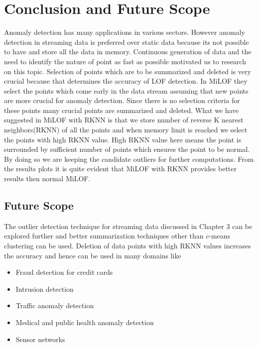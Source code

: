 \chapter{Conclusion and Future Scope}\label{Conclusion and Future Scope}
Anomaly detection has many applications in various sectors. However anomaly detection in
streaming data is preferred over static data because its not possible to have and store all the data
in memory. Continuous generation of data and the need to identify the nature of point as fast as
possible motivated us to research on this topic.
Selection of points which are to be summarized and deleted is very crucial because that determines
the accuracy of LOF detection. In MiLOF they select the points which come early in the data stream
assuming that new points are more crucial for anomaly detection. Since there is no selection criteria
for these points many crucial points are summarized and deleted. What we have suggested in MiLOF
with RKNN is that we store number of reverse K nearest neighbors(RKNN) of all the points and
when memory limit is reached we select the points with high RKNN value. High RKNN value here
means the point is surrounded by sufficient number of points which ensures the point to be normal.
By doing so we are keeping the candidate outliers for further computations. From the results plots
it is quite evident that MiLOF with RKNN provides better results then normal MiLOF.

\section{Future Scope}

The outlier detection technique for streaming data discussed in Chapter 3 can be explored further and better summarization techniques other than $c$-means clustering can be used. Deletion of data points with high RKNN values increases the accuracy and hence can be used in many domains like


	\begin{itemize}
		
		\item Fraud detection for credit cards
		\item Intrusion detection
		\item Traffic anomaly detection 
		\item Medical and public health anomaly detection
		\item Sensor networks
	\end{itemize}



